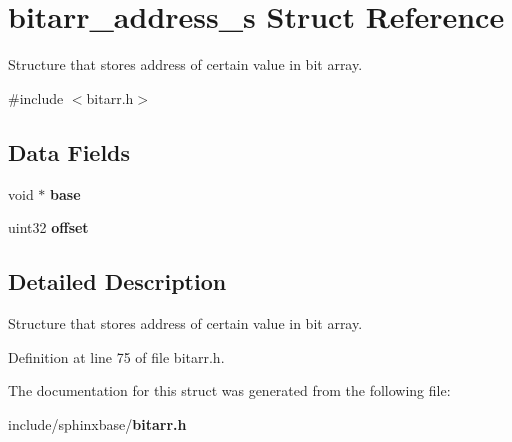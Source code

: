 \section{bitarr\+\_\+address\+\_\+s Struct Reference}
\label{structbitarr__address__s}


Structure that stores address of certain value in bit array.  




{\ttfamily \#include $<$bitarr.\+h$>$}

\subsection*{Data Fields}
\begin{DoxyCompactItemize}
\item 
void $\ast$ {\bfseries base}\label{structbitarr__address__s_a2ac6eb57a1f8feea9d3ab947af61cd26}

\item 
uint32 {\bfseries offset}\label{structbitarr__address__s_a25e454a04427113d373f6200a6c87de2}

\end{DoxyCompactItemize}


\subsection{Detailed Description}
Structure that stores address of certain value in bit array. 

Definition at line 75 of file bitarr.\+h.



The documentation for this struct was generated from the following file\+:\begin{DoxyCompactItemize}
\item 
include/sphinxbase/{\bf bitarr.\+h}\end{DoxyCompactItemize}
